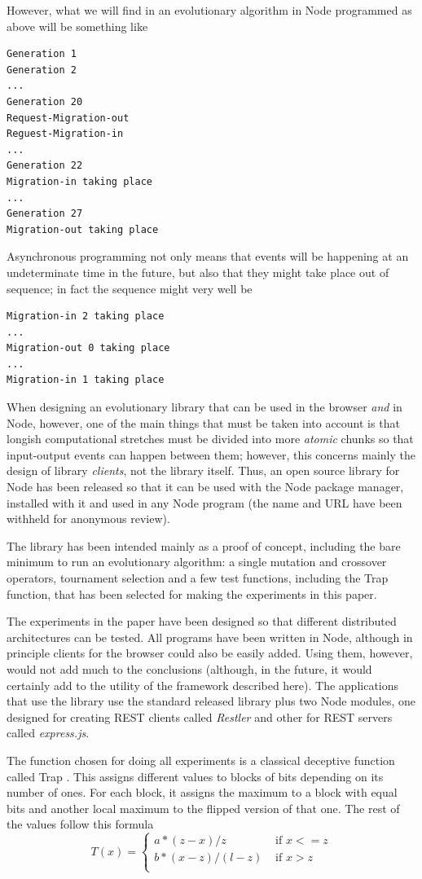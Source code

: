 \documentclass{sig-alternate}
\begin{document}
However, what we will find in an evolutionary algorithm in Node
programmed as above will be something like
\begin{lstlisting}
Generation 1
Generation 2
...
Generation 20
Request-Migration-out
Reguest-Migration-in
...
Generation 22
Migration-in taking place
...
Generation 27
Migration-out taking place
\end{lstlisting}
Asynchronous programming not only means that events will be happening
at an undeterminate time in the future, but also that they might take
place out of sequence; in fact the sequence might very well be
\begin{lstlisting}
Migration-in 2 taking place
...
Migration-out 0 taking place
...
Migration-in 1 taking place
\end{lstlisting}

When designing an evolutionary library that can be used in the browser
{\em and} in Node, however, one of the main things that must be taken
into account is that longish computational stretches must be divided
into more {\em atomic} chunks so that input-output events can happen
between them; however, this concerns mainly the design of library {\em
  clients}, not the library itself. Thus, an open source library for
Node has been released  so that it can be used with the Node package
manager, installed with it and used in any Node program (the name and
URL have been withheld for anonymous review).

The library has been intended mainly as a proof of concept, including
the bare minimum to run an evolutionary algorithm: a single mutation
and crossover operators, tournament selection and a few test
functions, including the Trap function, that has been selected for
making the experiments in this paper. 

The experiments in the paper have been designed so that different
distributed architectures can be tested. All programs have been
written in Node, although in principle clients for the browser could
also be easily added. Using them, however, would not add much to the
conclusions (although, in the future, it would certainly add to the
utility of the framework described here). The applications that use
the library use the standard released library plus two Node modules,
one designed for creating REST clients called {\em Restler} and other
for REST servers called {\em express.js}. 

The function chosen for doing all experiments is a classical deceptive
function called Trap \cite{ackley:trap}. This assigns different values
to blocks of bits depending on its number of ones. For each block, it
assigns the maximum to a block with equal bits and another local
maximum to the flipped version of that one. The rest of the values
follow this formula
$$
  T(x) = \left\{ \begin{array}{rl} 
      a*(z-x)/z &\mbox{ if  $x<= z$} \\
    b*(x-z)/(l-z) &\mbox{ if  $x>z$} \\
\end{array}\right.
$$
\end{document}
